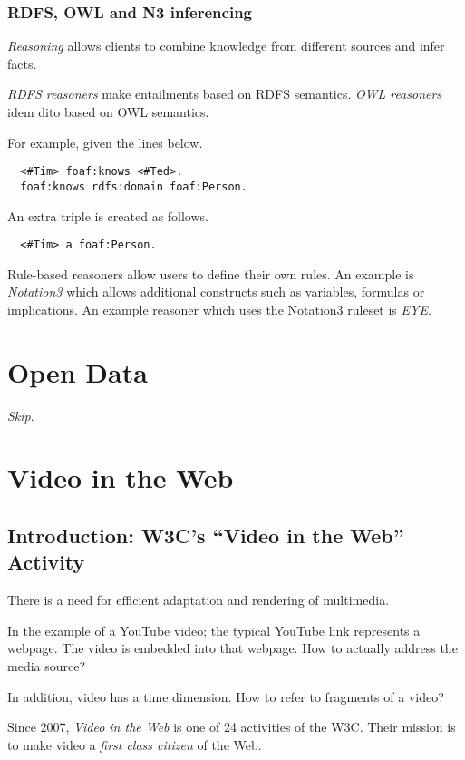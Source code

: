 \documentclass{report}
\begin{document}
\subsection{RDFS, OWL and N3 inferencing}

\emph{Reasoning} allows clients
to combine knowledge from different sources
and infer facts.

\emph{RDFS reasoners} make entailments
based on RDFS semantics.
\emph{OWL reasoners} idem dito
based on OWL semantics.

For example, given the lines below.
\begin{lstlisting}
  <#Tim> foaf:knows <#Ted>.
  foaf:knows rdfs:domain foaf:Person.
\end{lstlisting}
An extra triple is created as follows.
\begin{lstlisting}
  <#Tim> a foaf:Person.
\end{lstlisting}

Rule-based reasoners allow users
to define their own rules.
An example is \emph{Notation3}
which allows additional constructs
such as variables, formulas or implications.
An example reasoner
which uses the Notation3 ruleset
is \emph{EYE}.

\chapter{Open Data}

\textit{Skip}.

\chapter{Video in the Web}

\section{Introduction: W3C's ``Video in the Web'' Activity}

There is a need for efficient adaptation
and rendering of multimedia.

In the example of a YouTube video;
the typical YouTube link represents a webpage.
The video is embedded into that webpage.
How to actually address the media source?

In addition, video has a time dimension.
How to refer to fragments of a video?

Since 2007, \emph{Video in the Web} is
one of 24 activities of the W3C.
Their mission is to make video
a \emph{first class citizen} of the Web.
\end{document}
